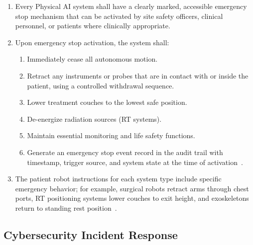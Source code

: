 \begin{enumerate}[label=(\alph*)]
\item Every Physical AI system shall have a clearly marked, accessible emergency
  stop mechanism that can be activated by site safety officers, clinical
  personnel, or patients where clinically appropriate.

\item Upon emergency stop activation, the system shall:
  \begin{enumerate}[label=(\arabic*)]
  \item Immediately cease all autonomous motion.
  \item Retract any instruments or probes that are in contact with or
    inside the patient, using a controlled withdrawal sequence.
  \item Lower treatment couches to the lowest safe position.
  \item De-energize radiation sources (RT systems).
  \item Maintain essential monitoring and life safety functions.
  \item Generate an emergency stop event record in the audit trail with
    timestamp, trigger source, and system state at the time of
    activation~\cite{iche6r3adapt}.
  \end{enumerate}

\item The patient robot instructions for each system type include specific
  emergency behavior; for example, surgical robots retract arms through chest
  ports, RT positioning systems lower couches to exit height, and
  exoskeletons return to standing rest position~\cite{patientinstructions2026}.
\end{enumerate}

\subsection{Cybersecurity Incident Response}


